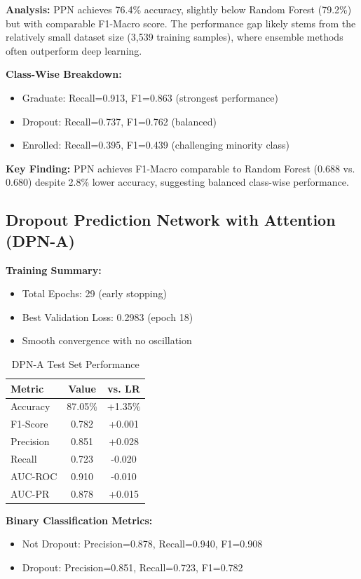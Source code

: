 \textbf{Analysis:} PPN achieves 76.4\% accuracy, slightly below Random Forest (79.2\%) but with comparable F1-Macro score. The performance gap likely stems from the relatively small dataset size (3,539 training samples), where ensemble methods often outperform deep learning.

\textbf{Class-Wise Breakdown:}
\begin{itemize}
\item Graduate: Recall=0.913, F1=0.863 (strongest performance)
\item Dropout: Recall=0.737, F1=0.762 (balanced)
\item Enrolled: Recall=0.395, F1=0.439 (challenging minority class)
\end{itemize}

\textbf{Key Finding:} PPN achieves F1-Macro comparable to Random Forest (0.688 vs. 0.680) despite 2.8\% lower accuracy, suggesting balanced class-wise performance.

\subsection{Dropout Prediction Network with Attention (DPN-A)}

\textbf{Training Summary:}
\begin{itemize}
\item Total Epochs: 29 (early stopping)
\item Best Validation Loss: 0.2983 (epoch 18)
\item Smooth convergence with no oscillation
\end{itemize}

\begin{table}[h]
\centering
\caption{DPN-A Test Set Performance}
\label{tab:dpna_perf}
\begin{tabular}{lcc}
\toprule
\textbf{Metric} & \textbf{Value} & \textbf{vs. LR} \\
\midrule
Accuracy & 87.05\% & +1.35\% \\
F1-Score & 0.782 & +0.001 \\
Precision & 0.851 & +0.028 \\
Recall & 0.723 & -0.020 \\
AUC-ROC & 0.910 & -0.010 \\
AUC-PR & 0.878 & +0.015 \\
\bottomrule
\end{tabular}
\end{table}

\textbf{Binary Classification Metrics:}
\begin{itemize}
\item Not Dropout: Precision=0.878, Recall=0.940, F1=0.908
\item Dropout: Precision=0.851, Recall=0.723, F1=0.782
\end{itemize}

